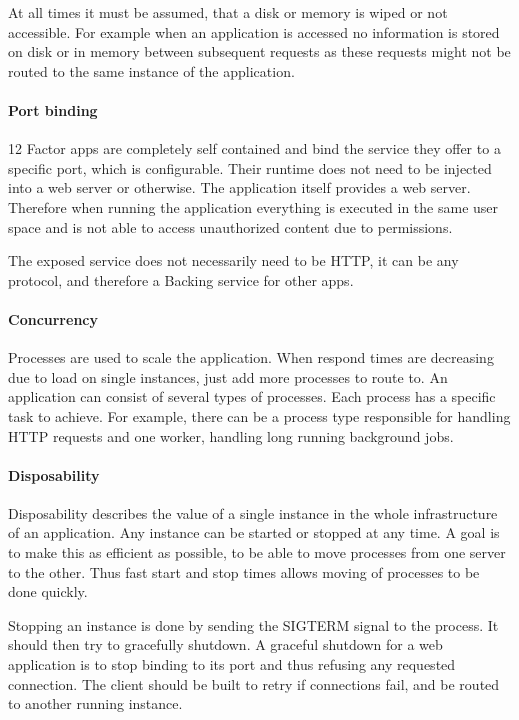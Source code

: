 At all times it must be assumed, that a disk or memory is wiped or not
accessible. For example when an application is accessed no information is
stored on disk or in memory between subsequent requests as these requests might
not be routed to the same instance of the application.

\paragraph{Port binding}

12 Factor apps are completely self contained and bind the service they offer to
a specific port, which is configurable. Their runtime does not need to be
injected into a web server or otherwise. The application itself provides a
web server.  Therefore when running the application everything is executed in
the same user space and is not able to access unauthorized content due to
permissions.

The exposed service does not necessarily need to be HTTP, it can be any
protocol, and therefore a Backing service for other apps.

\paragraph{Concurrency}

Processes are used to scale the application. When respond times are decreasing
due to load on single instances, just add more processes to route to. An
application can consist of several types of processes. Each process has a
specific task to achieve. For example, there can be a process type responsible
for handling HTTP requests and one worker, handling long running background
jobs.

\paragraph{Disposability}

Disposability describes the value of a single instance in the whole
infrastructure of an application. Any instance can be started or stopped at any
time. A goal is to make this as efficient as possible, to be able to move
processes from one server to the other. Thus fast start and stop times allows
moving of processes to be done quickly.

Stopping an instance is done by sending the SIGTERM signal to the process. It
should then try to gracefully shutdown. A graceful shutdown for a web
application is to stop binding to its port and thus refusing any requested
connection. The client should be built to retry if connections fail, and be
routed to another running instance.

